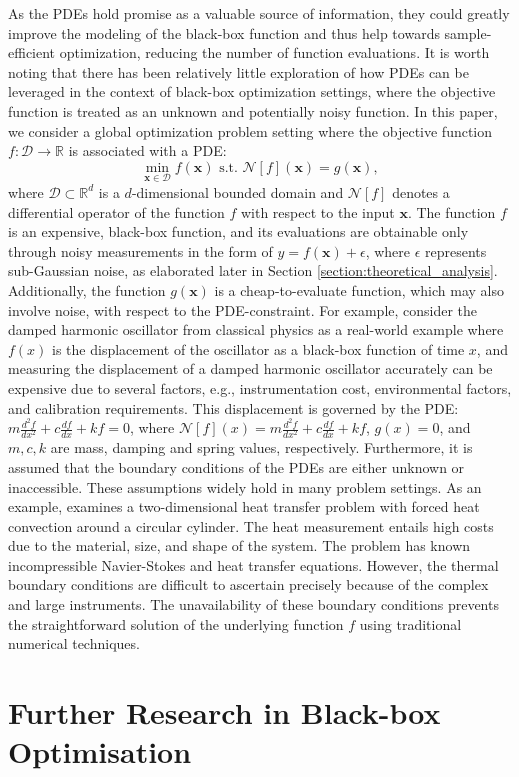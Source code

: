 As the PDEs hold promise as a valuable source of information, they could greatly improve the modeling of the black-box function and thus help towards sample-efficient optimization, reducing the number of function evaluations. It is worth noting that there has been relatively little exploration of how PDEs can be leveraged in the context of black-box optimization settings, where the objective function is treated as an unknown and potentially noisy function. 
In this paper, we consider a global optimization problem setting where the objective function $f \colon \mathcal{D} \rightarrow \mathbb{R}$ is associated with a PDE:   
\begin{equation*}
        \underset{\mathbf{x} \in \mathcal{D}}{\min} f(\mathbf{x}) \text{ s.t. }  \mathcal{N}[f](\mathbf{x}) = g(\mathbf{x}),
\end{equation*} 
where $\mathcal{D} \subset \mathbb{R}^d$ is a $d$-dimensional bounded domain and $\mathcal{N}[f]$ denotes a differential operator of the function $f$ with respect to the input $\mathbf{x}$. The function $f$ is an expensive, black-box function, and its evaluations are obtainable only through noisy measurements in the form of $y = f(\mathbf{x}) + \epsilon$, where $\epsilon$ represents sub-Gaussian noise, as elaborated later in Section \ref{section:theoretical_analysis}. Additionally, the function $g(\mathbf{x})$ is a cheap-to-evaluate function, which may also involve noise, with respect to the PDE-constraint. For example, consider the damped harmonic oscillator from classical physics as a real-world example where $f(x)$ is the displacement of the oscillator as a black-box function of time $x$, and measuring the displacement of a damped harmonic oscillator accurately can be expensive due to several factors, e.g., instrumentation cost, environmental factors, and calibration requirements. This displacement is governed by the PDE: $m \frac{d^2f}{dx^2} + c \frac{df}{dx} + kf = 0$, where $\mathcal{N}[f](x) = m \frac{d^2f}{dx^2} + c \frac{df}{dx} + kf$, $g(x)=0$, and $m, c, k$ are mass, damping and spring values, respectively. Furthermore, it is assumed that the boundary conditions of the PDEs are either unknown or inaccessible. These assumptions widely hold in many problem settings. As an example, \cite{cai2020heat} examines a two-dimensional heat transfer problem with forced heat convection around a circular cylinder. The heat measurement entails high costs due to the material, size, and shape of the system. The problem has known incompressible Navier-Stokes and heat transfer equations. However, the thermal boundary conditions are difficult to ascertain precisely because of the complex and large instruments. The unavailability of these boundary conditions prevents the straightforward solution of the underlying function $f$ using traditional numerical techniques. 

\section{Further Research in Black-box Optimisation}
\label{section:bo_further_research}


